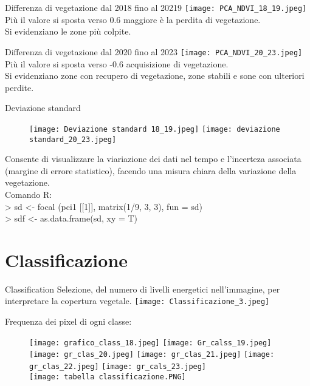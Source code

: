\documentclass[10pt]{beamer}
\begin{document}
\begin{frame}
Differenza di vegetazione dal 2018 fino al 20219
\centering
\texttt{[image: PCA\_NDVI\_18\_19.jpeg]}\\
Più il valore si sposta verso 0.6 maggiore è la perdita di vegetazione.\\
Si evidenziano le zone più colpite.
\end{frame}
\begin{frame}
Differenza di vegetazione dal 2020 fino al 2023
\centering
\texttt{[image: PCA\_NDVI\_20\_23.jpeg]}\\
Più il valore si sposta verso -0.6 acquisizione di vegetazione.\\
Si evidenziano zone con recupero di vegetazione, zone stabili e sone con ulteriori perdite.
\end{frame}   

\begin{frame}{Deviazione standard}
\begin{figure}
        \centering
        \texttt{[image: Deviazione standard 18\_19.jpeg]}
        \texttt{[image: deviazione standard\_20\_23.jpeg]} 
    \end{figure}
      Consente di visualizzare la viariazione dei dati nel tempo e l'incerteza associata (margine di errore statistico), facendo una misura chiara della variazione della vegetazione.\\
      Comando R: \\
      > sd <- focal (pci1 [[1]], matrix(1/9, 3, 3), fun = sd)\\
      > sdf <- as.data.frame(sd, xy = T)\\
\end{frame}

\section{Classificazione}
\begin{frame}{Classification}
Selezione, del numero di livelli energetici nell'immagine, per interpretare la copertura vegetale.
\texttt{[image: Classificazione\_3.jpeg]}
\end{frame}
\begin{frame}
Frequenza dei pixel di ogni classe:
\begin{figure}
        \centering
        \texttt{[image: grafico\_class\_18.jpeg]}
        \texttt{[image: Gr\_calss\_19.jpeg]} 
        \texttt{[image: gr\_clas\_20.jpeg]}
        \texttt{[image: gr\_clas\_21.jpeg]}
        \texttt{[image: gr\_clas\_22.jpeg]} 
        \texttt{[image: gr\_cals\_23.jpeg]}\\
        \texttt{[image: tabella classificazione.PNG]}
    \end{figure}
\end{frame}
\end{document}

